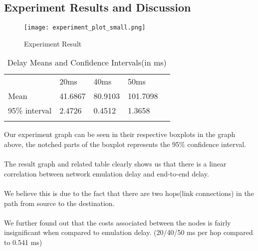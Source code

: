 \documentclass[conference]{IEEEtran}
\begin{document}
\subsection{Experiment Results and Discussion}

\begin{figure}[H]
    \centering
    \texttt{[image: experiment\_plot\_small.png]}
    \caption{Experiment Result}
    \label{fig:topology}
\end{figure}

\begin{table}[H]
\caption{Delay Means and Confidence Intervals(in ms)}
\begin{tabular}{lllll}
              & 20ms      & 40ms      & 50ms       &  \\
Mean          & 41.6867 & 80.9103 & 101.7098 &  \\
95\% interval & 2.4726  & 0.4512  & 1.3658   &  \\
              &         &         &          & 
\end{tabular}
\end{table}

Our experiment graph can be seen in their respective boxplots in the graph above, the notched parts of the boxplot represents the 95\% confidence interval. \\
\\
The result graph and related table clearly shows us that there is a linear correlation between network emulation delay and end-to-end delay.\\
\\
We believe this is due to the fact that there are two hops(link connections) in the path from source to the destination. \\
\\
We further found out that the costs associated between the nodes is fairly insignificant when compared to emulation delay. (20/40/50 ms per hop compared to 0.541 ms)
\end{document}
